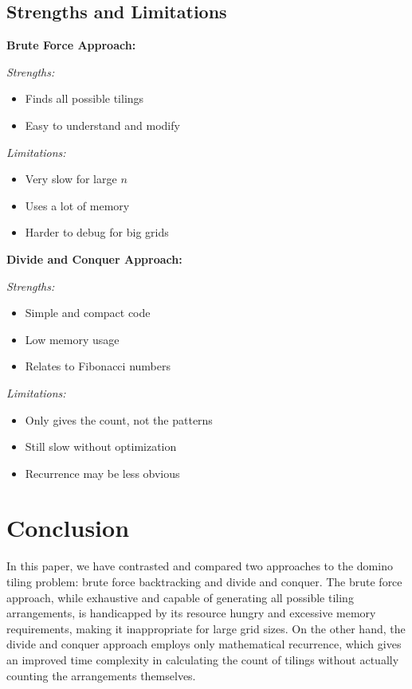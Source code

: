 \documentclass[conference]{IEEEtran}
\begin{document}
\subsection{Strengths and Limitations}

\textbf{Brute Force Approach:}

\textit{Strengths:}
\begin{itemize}
    \item Finds all possible tilings
    \item Easy to understand and modify
\end{itemize}

\textit{Limitations:}
\begin{itemize}
    \item Very slow for large $n$
    \item Uses a lot of memory
    \item Harder to debug for big grids
\end{itemize}

\textbf{Divide and Conquer Approach:}

\textit{Strengths:}
\begin{itemize}
    \item Simple and compact code
    \item Low memory usage
    \item Relates to Fibonacci numbers
\end{itemize}

\textit{Limitations:}
\begin{itemize}
    \item Only gives the count, not the patterns
    \item Still slow without optimization
    \item Recurrence may be less obvious
\end{itemize}

\section{Conclusion}

In this paper, we have contrasted and compared two approaches to the domino tiling problem: brute force backtracking and divide and conquer. The brute force approach, while exhaustive and capable of generating all possible tiling arrangements, is handicapped by its resource hungry and excessive memory requirements, making it inappropriate for large grid sizes. On the other hand, the divide and conquer approach employs only mathematical recurrence, which gives an improved time complexity in calculating the count of tilings without actually counting the arrangements themselves.
\end{document}
